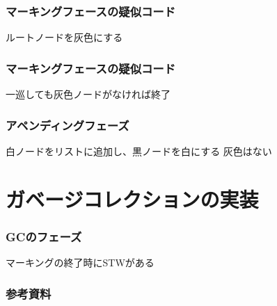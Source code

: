 \documentclass[unicode, 14pt, aspectratio=169]{beamer}
\begin{document}
\begin{frame}
  \frametitle{マーキングフェースの疑似コード}
  {\large ルートノードを灰色にする}
  \begin{center}
    
    \end{center}
\end{frame}
\begin{frame}
  \frametitle{マーキングフェースの疑似コード}
  {\large 一巡しても灰色ノードがなければ終了}
\end{frame}
\begin{frame}
  \frametitle{アペンディングフェーズ}
  {\large 白ノードをリストに追加し、黒ノードを白にする}
  灰色はない
\end{frame}
\section{ガベージコレクションの実装}
\begin{frame}
  \frametitle{GCのフェーズ}
  {\large マーキングの終了時にSTWがある}
\end{frame}
\begin{frame}[allowframebreaks,t]
  \frametitle{参考資料}
  \printbibliography
  \nocite{*}
\end{frame}
\end{document}
